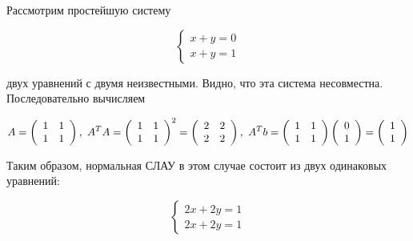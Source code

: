 \begin{example}
    Рассмотрим простейшую систему

    \begin{equation}
        \begin{cases}
            x + y = 0 \\
            x + y = 1
        \end{cases}
    \end{equation}

    двух уравнений с двумя неизвестными. Видно, что эта система несовместна. Последовательно вычисляем

    \begin{equation}
        A = \left(\begin{array}{cc}
            1 & 1 \\
            1 & 1
        \end{array}\right), \thinspace \thinspace
        A^TA = \left(\begin{array}{cc}
            1 & 1 \\
            1 & 1
        \end{array}\right)^2 = \left(\begin{array}{cc}
            2 & 2 \\
            2 & 2
        \end{array}\right), \thinspace \thinspace
        A^Tb = \left(\begin{array}{cc}
            1 & 1 \\
            1 & 1
        \end{array}\right)\left(\begin{array}{c}
            0 \\
            1
        \end{array}\right) = \left(\begin{array}{c}
            1 \\
            1
        \end{array}\right)
    \end{equation}

    Таким образом, нормальная СЛАУ в этом случае состоит из двух одинаковых уравнений:

    \begin{equation}
        \begin{cases}
            2x + 2y = 1 \\
            2x + 2y = 1
        \end{cases}
    \end{equation}


\end{example}
